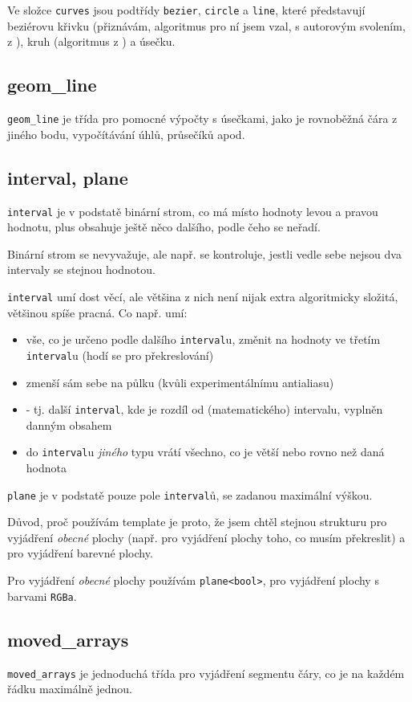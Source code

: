 \documentclass[11pt]{article} %
\begin{document}
Ve složce \texttt{curves} jsou podtřídy \texttt{bezier}, \texttt{circle} a \texttt{line}, které představují beziérovu křivku (přiznávám, algoritmus pro ní jsem vzal, s autorovým svolením, z \cite{Bezier}), kruh (algoritmus z \cite{Pelikan2}) a úsečku.

\subsection{geom\_line}
\texttt{geom\_line} je třída pro pomocné výpočty s úsečkami, jako je rovnoběžná čára z jiného bodu, vypočítávání úhlů, průsečíků apod. 

\subsection{interval, plane}
\texttt{interval} je v podstatě binární strom, co má místo hodnoty levou a pravou hodnotu, plus obsahuje ještě něco dalšího, podle čeho se neřadí.

Binární strom se nevyvažuje, ale např. se kontroluje, jestli vedle sebe nejsou dva intervaly se stejnou hodnotou.

\texttt{interval} umí dost věcí, ale většina z nich není nijak extra algoritmicky složitá, většinou spíše pracná. Co např. umí:
\begin{itemize}
    \item vše, co je určeno podle dalšího \texttt{interval}u, změnit na hodnoty ve třetím \texttt{interval}u (hodí se pro překreslování)
    \item zmenší sám sebe na půlku (kvůli experimentálnímu antialiasu)
    \item {} - tj. další \texttt{interval}, kde je rozdíl od (matematického) intervalu, vyplněn danným obsahem
    \item do \texttt{interval}u \emph{jiného} typu vrátí všechno, co je větší nebo rovno než daná hodnota
\end{itemize}

\texttt{plane} je v podstatě pouze pole \texttt{interval}ů, se zadanou maximální výškou.

Důvod, proč používám template je proto, že jsem chtěl stejnou strukturu pro vyjádření \emph{obecné} plochy (např. pro vyjádření plochy toho, co musím překreslit) a pro vyjádření barevné plochy. 

Pro vyjádření \emph{obecné} plochy používám \texttt{plane<bool>}, pro vyjádření plochy s barvami \texttt{RGBa}.

\subsection{moved\_arrays}
\texttt{moved\_arrays} je jednoduchá třída pro vyjádření segmentu čáry, co je na každém řádku maximálně jednou.
\end{document}
